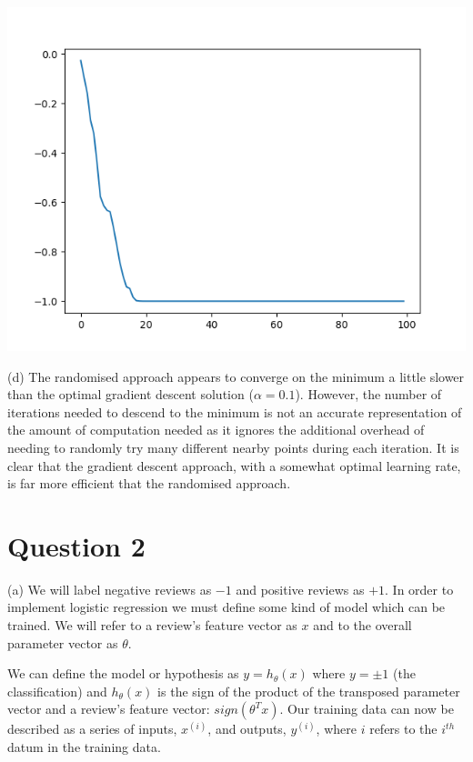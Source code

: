 \documentclass[12pt]{article}
\begin{document}
\begin{center}
    \includegraphics[scale=0.6]{q1_rand_plot.png}
\end{center}

\noindent (d) The randomised approach appears to converge on the minimum a little slower than the optimal gradient descent solution ($\alpha = 0.1$). However, the number of iterations needed to descend to the minimum is not an accurate representation of the amount of computation needed as it ignores the additional overhead of needing to randomly try many different nearby points during each iteration. It is clear that the gradient descent approach, with a somewhat optimal learning rate, is far more efficient that the randomised approach.

\section*{Question 2}

\noindent (a) We will label negative reviews as $-1$ and positive reviews as $+1$. In order to implement logistic regression we must define some kind of model which can be trained. We will refer to a review's feature vector as $x$ and to the overall parameter vector as $\theta$.

\indent We can define the model or hypothesis as $y = h_{\theta}(x)$ where $y = \pm 1$ (the classification) and $h_{\theta}(x)$ is the sign of the product of the transposed parameter vector and a review's feature vector: $sign(\theta^{T}x)$. Our training data can now be described as a series of inputs, $x^{(i)}$, and outputs, $y^{(i)}$, where $i$ refers to the $i^{th}$ datum in the training data.
\end{document}
